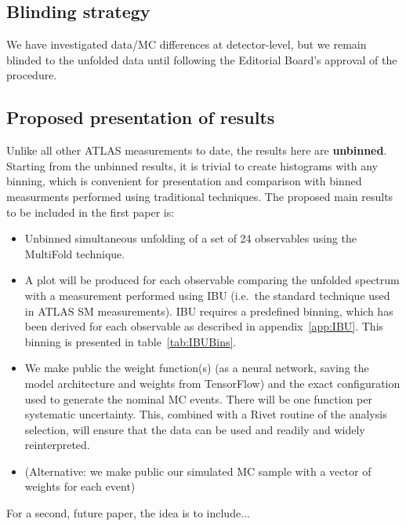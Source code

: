 \subsection{Blinding strategy}

We have investigated data/MC differences at detector-level, but we remain blinded to the unfolded data until following the Editorial Board's approval of the procedure.

\subsection{Proposed presentation of results}

Unlike all other ATLAS measurements to date, the results here are \textbf{unbinned}.
Starting from the unbinned results, it is trivial to create histograms with any binning, which is convenient for presentation and comparison with binned measurments performed using traditional techniques.
The proposed main results to be included in the first paper is:


\begin{itemize}
\item
  Unbinned simultaneous unfolding of a set of 24 observables using the MultiFold technique.
\item
   A plot will be produced for each observable comparing the unfolded spectrum with a measurement performed using IBU (i.e.\ the standard technique used in ATLAS SM measurements).
   IBU requires a predefined binning, which has been derived for each observable as described in appendix~\ref{app:IBU}. This binning is presented in table~\ref{tab:IBUBins}.
\item
  We make public the weight function(s) (as a neural network, saving the model architecture and weights from TensorFlow) and the exact configuration used to generate the nominal MC events.  There will be one function per systematic uncertainty.  This, combined with a Rivet routine of the analysis selection, will ensure that the data can be used and readily and widely reinterpreted.
\item (Alternative: we make public our simulated MC sample with a vector of weights for each event)
\end{itemize}


For a second, future paper, the idea is to include...

